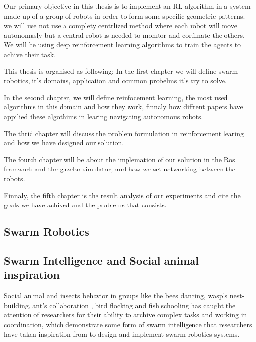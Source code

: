 \documentclass[12pt]{extarticle}
\begin{document}
Our primary objective in this thesis is to implement an RL algorithm in a system made up of a group of robots  in order to form some specific geometric patterns. we will use not use a complety centrlized method where each robot will move autonomusly but a central robot is needed to monitor and cordinate the others. We will be using deep reinforcement learning algorithms to train the agents to achive their task.


This thesis is organised as following:
In the first chapter we will define swarm robotics, it's domains, application and common probelms it's try to solve.

In the second chapter, we will define reinfocement learning, the most used algorithms in this domain and how they work, finnaly how diffrent papers have appilied these algothims in learing navigating autonomous robots.

\pagebreak
The thrid chapter will discuss the problem formulation in reinforcement learing and how we have designed  our solution.

The fourch chapter will be about the implemation of our solution in the Ros framwork and the gazebo simulator, and how we set networking between the robots.

Finnaly, the fifth chapter is the   result analysis of our experiments and cite the goals we have achived and the problems that consists.


   


  
 
 




\newpage
\pagebreak
\hspace{0pt}
\vfill
\begin{center}
\section{Swarm Robotics}
\end{center}
\vfill
\hspace{0pt}
\pagebreak




                  
\subsection{Swarm Intelligence and Social animal inspiration}
Social animal and insects behavior in groups like the bees dancing, wasp’s nest-building, ant's collaboration , bird flocking and fish schooling  has caught the attention of researchers for their ability to archive complex tasks and working in coordination, which demonstrate some form of swarm intelligence  that researchers have taken inspiration from to design and implement swarm robotics systems.\cite{navarro2013introduction} 
\end{document}

